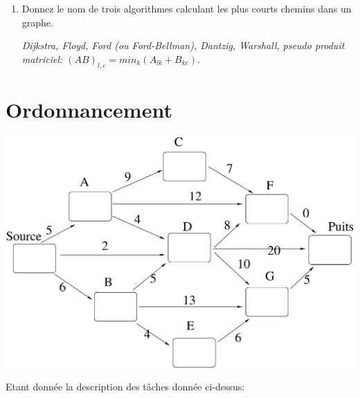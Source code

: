 \documentclass[11pt]{article}
\begin{document}
\begin{enumerate}
\item   Donnez le nom de trois algorithmes calculant les plus courts chemins dans un graphe.

\emph{Dijkstra, Floyd, Ford (ou Ford-Bellman), Dantzig, Warshall, pseudo produit matriciel: $(AB)_{l,c}= min_k (A_{lk} + B_{kc})$.}

\end{enumerate}

\section{Ordonnancement}

\begin{center}
\includegraphics[width=0.95\linewidth]{critique.eps}
\end{center}


Etant donnée la description des tâches donnée ci-dessus: 
\end{document}
